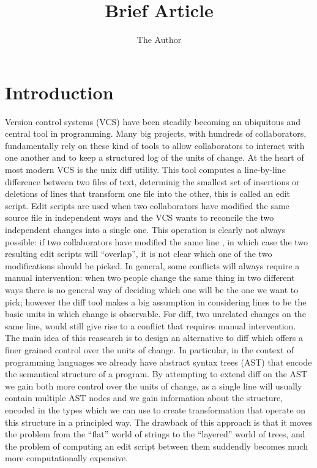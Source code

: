 \documentclass[11pt]{article}
\title{Brief Article}
\author{The Author}
\date{}
\begin{document}
\maketitle

\section{Introduction}
Version control systems (VCS) have been steadily becoming an ubiquitous and central 
tool in programming. Many big projects, with hundreds of collaborators, 
fundamentally rely on these kind of tools to allow collaborators to interact 
with one another and to keep a structured log of the units of change. 
At the heart of most modern VCS is the unix diff utility. This tool computes a 
line-by-line difference between two files of text, determinig the smallest set 
of insertions or deletions of lines that transform one file into the other, this is called an edit script. 
Edit scripts are used when two collaborators have modified the same source file in independent 
ways and the VCS wants to reconcile the two independent changes into a single 
one. This operation is clearly not always possible: if two collaborators have 
modified the same line , in which case the two resulting edit scripts will 
``overlap'', it is not clear which one of the two modifications should be 
picked. 
In general, some conflicts will always require a manual intervention: when two 
people change the same thing in two different ways there is no general way of 
deciding which one will be the one we want to pick; however the diff tool makes 
a big assumption in considering lines to be the basic units in which change is 
observable. 
For diff, two unrelated changes on the same line, would still give rise to a 
conflict that requires manual intervention. 
The main idea of this reasearch is to design an alternative to diff which offers a 
finer grained control over the units of change. In particular, in the context of 
programming languages we already have abstract syntax trees (AST) that encode 
the semantical structure of a program. By attempting to extend diff on the AST 
we gain both more control over the units of change, as a single line will 
usually contain multiple AST nodes and we gain information about the structure, encoded in the types which 
we can use to create transformation that operate on this structure in a principled way. 
The drawback of this approach is that it moves the problem from the ``flat'' 
world of strings to the ``layered'' world of trees, and the problem of computing an edit script between them suddendly
becomes much more computationally expensive. 
\end{document}

